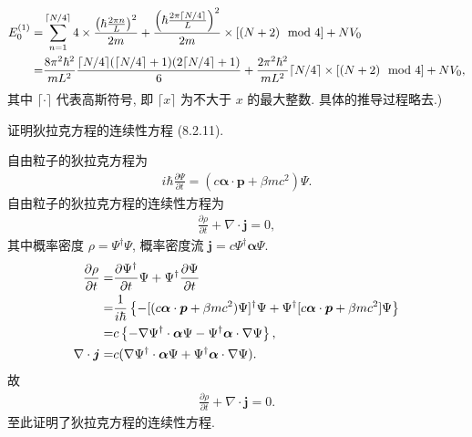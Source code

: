 \documentclass{assignment}
\begin{document}
\begin{sol}
{    \begin{align}
        \notag E_0^{(1)}=&\sum_{n=1}^{\lceil N/4\rceil}4\times\frac{\left(\hbar\frac{2\pi n}{L}\right)^2}{2m}+\frac{\left(\hbar\frac{2\pi\lceil N/4\rceil}{L}\right)^2}{2m}\times[(N+2)\mod 4]+NV_0\\
        =&\frac{8\pi^2\hbar^2}{mL^2}\frac{\lceil N/4\rceil(\lceil N/4\rceil+1)(2\lceil N/4\rceil+1)}{6}+\frac{2\pi^2\hbar^2}{mL^2}\lceil N/4\rceil\times[(N+2)\mod 4]+NV_0,
    \end{align}
    其中 $\lceil\cdot\rceil$ 代表高斯符号, 即 $\lceil x\rceil$ 为不大于 $x$ 的最大整数. 具体的推导过程略去.})
\end{sol}

\begin{prob}[课本习题 8.10]
    证明狄拉克方程的连续性方程 (8.2.11).
\end{prob}
\begin{pf}
    自由粒子的狄拉克方程为
    \begin{align}
        i\hbar\frac{\partial\Psi}{\partial t}=(c\bm{\alpha}\cdot\bm{p}+\beta mc^2)\Psi.
    \end{align}
    自由粒子的狄拉克方程的连续性方程为
    \begin{align}
        \frac{\partial\rho}{\partial t}+\nabla\cdot\bm{j}=0,
    \end{align}
    其中概率密度 $\rho=\Psi^{\dagger}\Psi$, 概率密度流 $\bm{j}=c\Psi^{\dagger}\bm{\alpha}\Psi$.
    \begin{align}
        \notag\frac{\partial\rho}{\partial t}=&\frac{\partial\Psi^{\dagger}}{\partial t}\Psi+\Psi^{\dagger}\frac{\partial\Psi}{\partial t}\\
        \notag=&\frac{1}{i\hbar}\left\{-[(c\bm{\alpha}\cdot\bm{p}+\beta mc^2)\Psi]^{\dagger}\Psi+\Psi^{\dagger}[c\bm{\alpha}\cdot\bm{p}+\beta mc^2]\Psi\right\}\\
        =&c\left\{-\nabla\Psi^{\dagger}\cdot\bm{\alpha}\Psi-\Psi^{\dagger}\bm{\alpha}\cdot\nabla\Psi\right\},\\
        \notag\nabla\cdot\bm{j}=&c(\nabla\Psi^{\dagger}\cdot\bm{\alpha}\Psi+\Psi^{\dagger}\bm{\alpha}\cdot\nabla\Psi).
    \end{align}
    故
    \begin{align}
        \frac{\partial\rho}{\partial t}+\nabla\cdot\bm{j}=0.
    \end{align}
    至此证明了狄拉克方程的连续性方程.
\end{pf}
\end{document}

